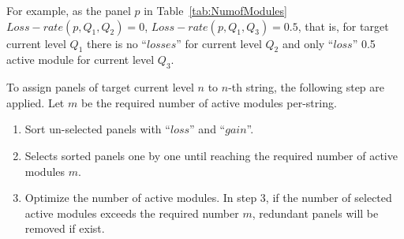 \documentclass[journal]{IEEEtran}
\begin{document}
For example, as the panel $p$ in Table~\ref{tab:NumofModules} $Loss-rate(p,Q_{1},Q_{2})=0$, $Loss-rate(p,Q_{1},Q_{3})=0.5$, that is, for target current level $Q_{1}$ there is no ``$losses$'' for current level $Q_{2}$ and only ``$loss$'' 0.5 active module for current level $Q_{3}$.

To assign panels of target current level $n$ to $n$-th string, the following step are applied.
Let $m$ be the required number of active modules per-string.
\begin{enumerate}
  \item\label{step:1} Sort un-selected panels with ``$loss$'' and ``$gain$''.
\item\label{step:2} Selects sorted panels one by one until reaching the required number of active modules $m$.
\item\label{step:3} Optimize the number of active modules.
  In step 3, if the number of selected active modules exceeds the required number $m$, redundant panels will be removed if exist.
\end{enumerate}
\end{document}
